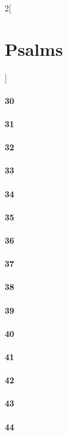 \documentclass{book}
\begin{document}
\begin{multicols}{2}[\part{Psalms}]
\subsection*{30}
\subsection*{31}
\subsection*{32}
\subsection*{33}
\subsection*{34}
\subsection*{35}
\subsection*{36}
\subsection*{37}
\subsection*{38}
\subsection*{39}
\subsection*{40}
\subsection*{41}
\subsection*{42}
\subsection*{43}
\subsection*{44}

\end{multicols}
\end{document}
